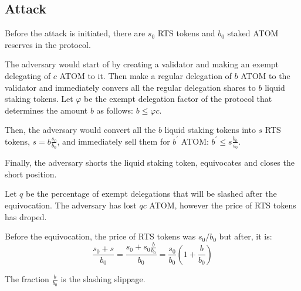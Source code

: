 \subsection{Attack}

Before the attack is initiated, there are $s_0$ RTS tokens and $b_0$
staked ATOM reserves in the protocol.

The adversary would start of by creating a validator and making an
exempt delegating of $c$ ATOM to it.
Then make a regular delegation of $b$ ATOM to the validator and
immediately convers all the regular delegation shares to $b$ liquid
staking tokens.
Let $\varphi$ be the exempt delegation factor of the protocol
that determines the amount $b$ as follows: $b \leq \varphi c$.

Then, the adversary would convert all the $b$ liquid staking tokens into
$s$ RTS tokens, $s = b \frac{s_0}{b_0}$, and immediately sell them for
$b^{'}$ ATOM: $b^{'} \leq s \frac{b_0}{s_0}$.

Finally, the adversary shorts the liquid staking token, equivocates
and closes the short position.

Let $q$ be the percentage of exempt delegations that will be slashed after
the equivocation. The adversary has lost $qc$ ATOM, however the price of RTS
tokens has droped.

Before the equivocation, the price of RTS tokens was $s_0/b_0$ but
after, it is:
\[
\frac{s_0 + s}{b_0} =
\frac{s_0 + s_0\frac{b}{b_0}}{b_0} =
\frac{s_0}{b_0} (1 + \frac{b}{b_0})
\]

The fraction $\frac{b}{b_0}$ is the slashing slippage.
